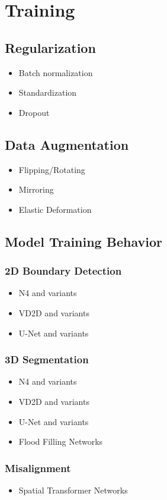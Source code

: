 \chapter{Training}

\section{Regularization}

\begin{itemize}
	\item Batch normalization
	\item Standardization
	\item Dropout
\end{itemize}

\section{Data Augmentation}

\begin{itemize}
	\item Flipping/Rotating
	\item Mirroring
	\item Elastic Deformation
\end{itemize}

\section{Model Training Behavior}

\subsection{2D Boundary Detection}

\begin{itemize}
	\item N4 and variants
	\item VD2D and variants
	\item U-Net and variants
\end{itemize}

\subsection{3D Segmentation}

\begin{itemize}
	\item N4 and variants
	\item VD2D and variants
	\item U-Net and variants
	\item Flood Filling Networks
\end{itemize}

\subsection{Misalignment}

\begin{itemize}
	\item Spatial Transformer Networks
\end{itemize}
